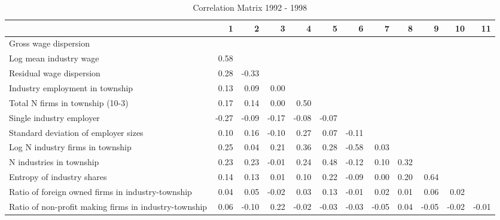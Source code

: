 \begin{table}[htb]
\centering
\caption{Correlation Matrix 1992 - 1998} 
\begin{tabular}{lrrrrrrrrrrr}
  \hline
 & 1 & 2 & 3 & 4 & 5 & 6 & 7 & 8 & 9 & 10 & 11 \\ 
  \hline
Gross wage dispersion &  &  &  &  &  &  &  &  &  &  &  \\ 
  Log mean industry wage & 0.58 &  &  &  &  &  &  &  &  &  &  \\ 
  Residual wage dispersion & 0.28 & -0.33 &  &  &  &  &  &  &  &  &  \\ 
  Industry employment in township & 0.13 & 0.09 & 0.00 &  &  &  &  &  &  &  &  \\ 
  Total N firms in township (10-3) & 0.17 & 0.14 & 0.00 & 0.50 &  &  &  &  &  &  &  \\ 
  Single industry employer & -0.27 & -0.09 & -0.17 & -0.08 & -0.07 &  &  &  &  &  &  \\ 
  Standard deviation of employer sizes & 0.10 & 0.16 & -0.10 & 0.27 & 0.07 & -0.11 &  &  &  &  &  \\ 
  Log N industry firms in township & 0.25 & 0.04 & 0.21 & 0.36 & 0.28 & -0.58 & 0.03 &  &  &  &  \\ 
  N industries in township & 0.23 & 0.23 & -0.01 & 0.24 & 0.48 & -0.12 & 0.10 & 0.32 &  &  &  \\ 
  Entropy of industry shares & 0.14 & 0.13 & 0.01 & 0.10 & 0.22 & -0.09 & 0.00 & 0.20 & 0.64 &  &  \\ 
  Ratio of foreign owned firms in industry-township & 0.04 & 0.05 & -0.02 & 0.03 & 0.13 & -0.01 & 0.02 & 0.01 & 0.06 & 0.02 &  \\ 
  Ratio of non-profit making firms in industry-township & 0.06 & -0.10 & 0.22 & -0.02 & -0.03 & -0.03 & -0.05 & 0.04 & -0.05 & -0.02 & -0.01 \\ 
   \hline
\end{tabular}
\end{table}
